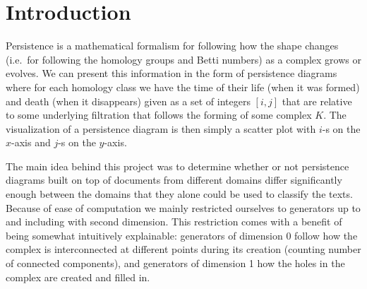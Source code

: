 \section{Introduction}
\label{sec:problem_description}

Persistence is a mathematical formalism for following how the shape changes
(i.e.\ for following the homology groups and Betti numbers) as a complex grows
or evolves. We can present this information in the form of persistence diagrams
where for each homology class we have the time of their life (when it was
formed) and death (when it disappears) given as a set of integers $[i, j]$
that are relative to some underlying filtration that follows the forming of
some complex $K$. The visualization of a persistence diagram is then simply a
scatter plot with $i$-s on the $x$-axis and $j$-s on the $y$-axis.

The main idea behind this project was to determine whether or not persistence
diagrams built on top of documents from different domains differ significantly
enough between the domains that they alone could be used to classify the texts.
Because of ease of computation we mainly restricted ourselves to generators up
to and including with second dimension. This restriction comes with a benefit
of being somewhat intuitively explainable: generators of dimension 0 follow how
the complex is interconnected at different points during its creation (counting
number of connected components), and generators of dimension 1 how the holes in
the complex are created and filled in.
